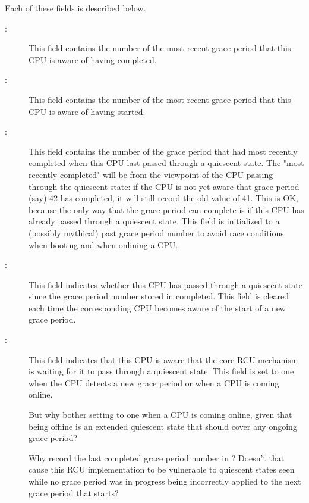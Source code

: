 Each of these fields is described below.

\begin{description}
\item[:]
	This field contains the number of the most recent grace period
	that this CPU is aware of having completed.
\item[:]
	This field contains the number of the most recent grace period
	that this CPU is aware of having started.
\item[:]
	This field contains the number of the grace period that had most
	recently completed when this
	CPU last passed through a quiescent state.
	The "most recently completed" will be from the viewpoint of
	the CPU passing through the quiescent state: if the CPU is
	not yet aware that grace period (say) 42 has completed, it
	will still record the old value of 41.
	This is OK, because the only way that the grace period can
	complete is if this CPU has already passed through a
	quiescent state.
	This field is initialized to a (possibly mythical) past
	grace period number to avoid race conditions when booting
	and when onlining a CPU.
\item[:]
	This field indicates whether this CPU has passed
	through a quiescent state since the grace period number
	stored in  completed.
	This field is cleared each time the corresponding CPU
	becomes aware of the start of a new grace period.
\item[:]
	This field indicates that this CPU is aware that the core
	RCU mechanism is waiting for it to pass through a quiescent state.
	This field is set to one when the CPU detects a new grace
	period or when a CPU is coming online.

\QuickQuiz{}
	But why bother setting  to one when a CPU
	is coming online, given that being offline is an extended
	quiescent state that should cover any ongoing grace period?
 \QuickQuizEnd

\QuickQuiz{}
	Why record the last completed grace period number in
	?
	Doesn't that cause this RCU implementation to be vulnerable
	to quiescent states seen while no grace period was in progress
	being incorrectly applied to the next grace period that starts?
\end{description}
